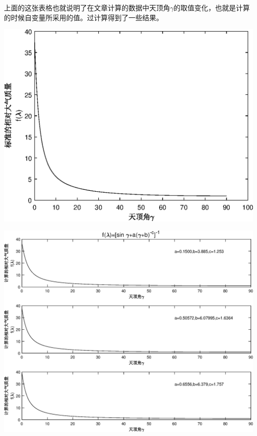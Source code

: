 \documentclass{aaa}
\makeatletter
\newcommand{\figcaption}{\def\@captype{figure}\caption}
\makeatother
\begin{document}
上面的这张表格也就说明了在文章计算的数据中天顶角$\gamma$的取值变化，也就是计算的时候自变量所采用的值。过计算得到了一些结果。
\begin{center}
	\includegraphics[width=16cm]{Standard.eps}
	\figcaption{标准的大气质量曲线}
\end{center}
\begin{center}
	\includegraphics[width=16cm]{Calculate.eps}
	\figcaption{按照近似公式计算的大气质量曲线}
\end{center}
\end{document}
